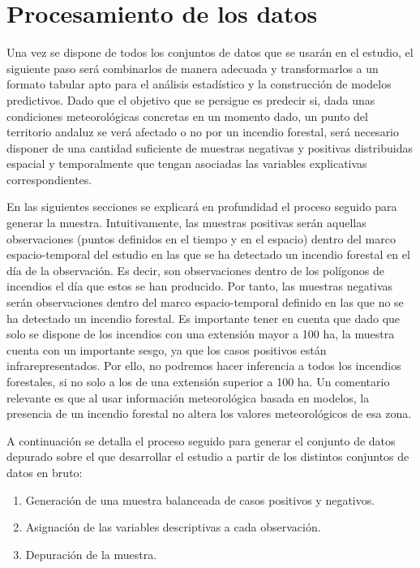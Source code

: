 \documentclass[12pt,a4paper,]{book}
\providecommand{\tightlist}{%
  \setlength{\itemsep}{0pt}\setlength{\parskip}{0pt}}
\numberwithin{dummy}{section}
\theoremstyle{ocrenumbox}
\theoremstyle{blacknumex}
\theoremstyle{blacknumbox}
\theoremstyle{ocrenum}
\theoremstyle{ocrenum}
\begin{document}
\hypertarget{procesamiento-de-los-datos}{%
\section{Procesamiento de los datos}\label{procesamiento-de-los-datos}}

Una vez se dispone de todos los conjuntos de datos que se usarán en el
estudio, el siguiente paso será combinarlos de manera adecuada y
transformarlos a un formato tabular apto para el análisis estadístico y
la construcción de modelos predictivos. Dado que el objetivo que se
persigue es predecir si, dada unas condiciones meteorológicas concretas
en un momento dado, un punto del territorio andaluz se verá afectado o
no por un incendio forestal, será necesario disponer de una cantidad
suficiente de muestras negativas y positivas distribuidas espacial y
temporalmente que tengan asociadas las variables explicativas
correspondientes.

En las siguientes secciones se explicará en profundidad el proceso
seguido para generar la muestra. Intuitivamente, las muestras positivas
serán aquellas observaciones (puntos definidos en el tiempo y en el
espacio) dentro del marco espacio-temporal del estudio en las que se ha
detectado un incendio forestal en el día de la observación. Es decir,
son observaciones dentro de los polígonos de incendios el día que estos
se han producido. Por tanto, las muestras negativas serán observaciones
dentro del marco espacio-temporal definido en las que no se ha detectado
un incendio forestal. Es importante tener en cuenta que dado que solo se
dispone de los incendios con una extensión mayor a 100 ha, la muestra
cuenta con un importante sesgo, ya que los casos positivos están
infrarepresentados. Por ello, no podremos hacer inferencia a todos los
incendios forestales, si no solo a los de una extensión superior a 100
ha. Un comentario relevante es que al usar información meteorológica
basada en modelos, la presencia de un incendio forestal no altera los
valores meteorológicos de esa zona.

A continuación se detalla el proceso seguido para generar el conjunto de
datos depurado sobre el que desarrollar el estudio a partir de los
distintos conjuntos de datos en bruto:

\begin{enumerate}
\def\labelenumi{\arabic{enumi}.}
\tightlist
\item
  Generación de una muestra balanceada de casos positivos y negativos.
\item
  Asignación de las variables descriptivas a cada observación.
\item
  Depuración de la muestra.
\end{enumerate}
\end{document}
